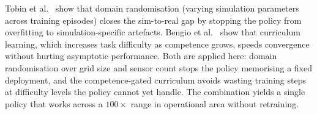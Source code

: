 Tobin et al.~\cite{tobin2017domain} show that domain randomisation (varying simulation parameters across training episodes) closes the sim-to-real gap by stopping the policy from overfitting to simulation-specific artefacts. Bengio et al.~\cite{bengio2009curriculum} show that curriculum learning, which increases task difficulty as competence grows, speeds convergence without hurting asymptotic performance. Both are applied here: domain randomisation over grid size and sensor count stops the policy memorising a fixed deployment, and the competence-gated curriculum avoids wasting training steps at difficulty levels the policy cannot yet handle. The combination yields a single policy that works across a $100\times$ range in operational area without retraining.
